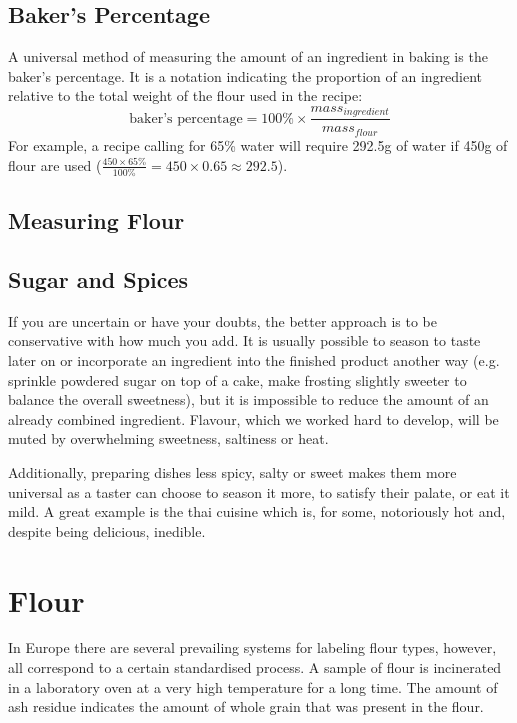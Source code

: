 \subsection{Baker's Percentage}
A universal method of measuring the amount of an ingredient in baking is the
baker's percentage. It is a notation indicating the proportion of an ingredient
relative to the total weight of the flour used in the recipe:
\begin{equation*}
\textrm{baker's percentage} = 100\% \times \frac{ mass_{ingredient} }{ mass_{flour} }
\end{equation*}
For example, a recipe calling for 65\% water will require 292.5g of water if
450g of flour are used ($\frac{450 \times 65\%}{100\%} = 450 \times 0.65
\approx 292.5$).

\subsection{Measuring Flour} \label{sec:measuring-flour}

\subsection{Sugar and Spices}
If you are uncertain or have your doubts, the better approach is to be
conservative with how much you add. It is usually possible to season to taste
later on or incorporate an ingredient into the finished product another way
(e.g. sprinkle powdered sugar on top of a cake, make frosting slightly sweeter
to balance the overall sweetness), but it is impossible to reduce the amount of
an already combined ingredient. Flavour, which we worked hard to develop, will
be muted by overwhelming sweetness, saltiness or heat.

Additionally, preparing dishes less spicy, salty or sweet makes them more
universal as a taster can choose to season it more, to satisfy their palate, or
eat it mild. A great example is the thai cuisine which is, for some,
notoriously hot and, despite being delicious, inedible.

\section{Flour}
In Europe there are several prevailing systems for labeling flour types,
however, all correspond to a certain standardised process. A sample of flour is
incinerated in a laboratory oven at a very high temperature for a long time.
The amount of ash residue indicates the amount of whole grain that was present
in the flour.

